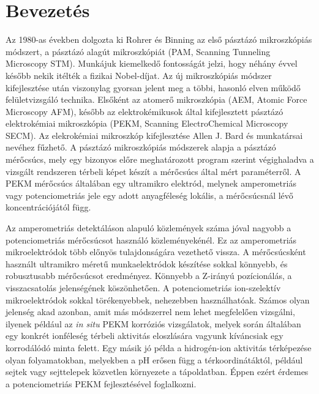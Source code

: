 \chapter{Bevezetés}
\pagestyle{headings}
Az 1980-as években dolgozta ki Rohrer és Binning az első pásztázó mikroszkópiás módszert, a pásztázó alagút mikroszkópiát (PAM, Scanning Tunneling Microscopy STM). Munkájuk kiemelkedő fontosságát jelzi, hogy néhány évvel később nekik itélték a fizikai Nobel-díjat. Az új mikroszkópiás módszer kifejlesztése után viszonylag gyorsan jelent meg a többi, hasonló elven működő felületvizsgáló technika. Elsőként az atomerő  mikroszkópia (AEM, Atomic Force Microscopy AFM), később az elektrokémikusok által kifejlesztett pásztázó elektrokémiai mikroszkópia (PEKM, Scanning ElectroChemical Microscopy SECM). Az elekrokémiai mikroszkóp kifejlesztése Allen J. Bard és munkatársai nevéhez fűzhető. A pásztázó mikroszkópiás módszerek alapja a pásztázó mérőcsúcs, mely egy bizonyos előre meghatározott program szerint végighaladva a vizsgált rendszeren térbeli képet készít a mérőcsúcs által mért paraméterről. A PEKM mérőcsúcs általában egy ultramikro elektród, melynek amperometriás vagy potenciometriás jele egy adott anyagféleség lokális, a mérőcsúcsnál lévő koncentrációjától függ.

Az amperometriás detektáláson alapuló közlemények száma jóval nagyobb a potenciometriás mérőcsúcsot használó közleményekénél. Ez az amperometriás mikroelektródok több előnyös tulajdonságára vezethető vissza. A mérőcsúcsként használt ultramikro méretű munkaelektródok készítése sokkal könnyebb, és robusztusabb mérőcsúcsot eredményez. Könnyebb a Z-irányú pozícionálás, a visszacsatolás jelenségének köszönhetően. A potenciometriás ion-szelektív mikroelektródok sokkal törékenyebbek, nehezebben használhatóak. Számos olyan jelenség akad azonban, amit más módszerrel nem lehet megfelelően vizsgálni, ilyenek például az \emph{in situ} PEKM korróziós vizsgálatok, melyek során általában egy konkrét ionféleség térbeli aktivitás eloszlására vagyunk kíváncsiak egy korrodálódó minta felett. Egy másik jó példa a hidrogén-ion aktivitás térképezése olyan folyamatokban, melyekben a pH erősen függ a térkoordinátáktól, például sejtek vagy sejttelepek közvetlen környezete a tápoldatban. Éppen ezért érdemes a potenciometriás PEKM fejlesztésével foglalkozni.

